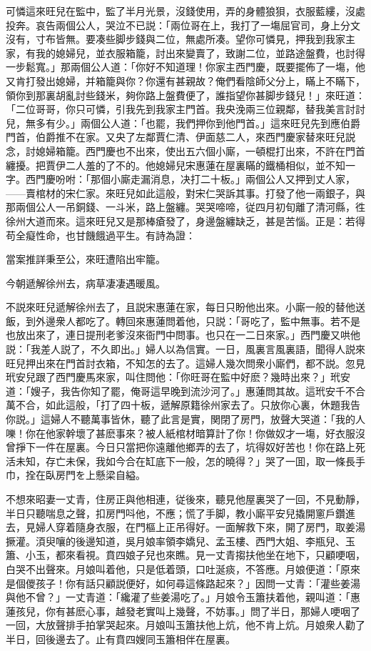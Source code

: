 可憐這來旺兒在監中，監了半月光景，沒錢使用，弄的身體狼狽，衣服藍縷，沒處投奔。哀告兩個公人，哭泣不已説：「兩位哥在上，我打了一塲屈官司，身上分文沒有，寸布皆無。要凑些脚步錢與二位，無處所凑。望你可憐見，押我到我家主家，有我的媳婦兒，並衣服箱籠，討出來變賣了，致謝二位，並路途盤費，也討得一步鬆寬。」那兩個公人道：「你好不知道理！你家主西門慶，既要擺佈了一塲，他又肯打發出媳婦，并箱籠與你？你還有甚親故？俺們看陰師父分上，瞞上不瞞下，領你到那裏胡亂討些錢米，夠你路上盤費便了，誰指望你甚脚步錢兒！」來旺道：「二位哥哥，你只可憐，引我先到我家主門首。我央浼兩三位親鄰，替我美言討討兒，無多有少。」兩個公人道：「也罷，我們押你到他門首。」這來旺兒先到應伯爵門首，伯爵推不在家。又央了左鄰賈仁清、伊面慈二人，來西門慶家替來旺兒説念，討媳婦箱籠。西門慶也不出來，使出五六個小廝，一頓棍打出來，不許在門首纏擾。把賈伊二人羞的了不的。他媳婦兒宋惠蓮在屋裏瞞的鐵桶相似，並不知一字。西門慶吩咐：「那個小廝走漏消息，决打二十板。」兩個公人又押到丈人家，——賣棺材的宋仁家。來旺兒如此這般，對宋仁哭訴其事。打發了他一兩銀子，與那兩個公人一吊銅錢、一斗米，路上盤纏。哭哭啼啼，従四月初旬離了清河縣，徃徐州大道而來。這來旺兒又是那棒瘡發了，身邊盤纏缺乏，甚是苦惱。正是：若得苟全癡性命，也甘饑餓過平生。有詩為證：

\begin{myquote}
當案推詳秉至公，來旺遭陷出牢籠。

今朝遞解徐州去，病草凄凄遇暖風。
\end{myquote}

不説來旺兒遞解徐州去了，且説宋惠蓮在家，每日只盼他出來。小廝一般的替他送飯，到外邊衆人都吃了。轉回來惠蓮問着他，只説：「哥吃了，監中無事。若不是也放出來了，連日提刑老爹沒來衙門中問事。也只在一二日來家。」西門慶又哄他説：「我差人説了，不久即出。」婦人以為信實。一日，風裏言風裏語，聞得人説來旺兒押出來在門首討衣箱，不知怎的去了。這婦人幾次問衆小廝們，都不説。忽見玳安兒跟了西門慶馬來家，叫住問他：「你旺哥在監中好麽？幾時出來？」玳安道：「嫂子，我告你知了罷，俺哥這早晚到流沙河了。」惠蓮問其故。這玳安千不合萬不合，如此這般，「打了四十板，遞解原籍徐州家去了。只放你心裏，休題我告你説。」這婦人不聽萬事皆休，聽了此言是實，関閉了房門，放聲大哭道：「我的人嚛！你在他家幹壞了甚麽事來？被人紙棺材暗算計了你！你做奴才一塲，好衣服沒曾掙下一件在屋裏。今日只當把你遠離他鄉弄的去了，坑得奴好苦也！你在路上死活未知，存亡未保，我如今合在缸底下一般，怎的曉得？」哭了一囬，取一條長手巾，拴在臥房門を上懸梁自縊。

不想來昭妻一丈青，住房正與他相連，従後來，聽見他屋裏哭了一回，不見動靜，半日只聽喘息之聲，扣房門呌他，不應；慌了手脚，教小廝平安兒撬開窻戶鑽進去，見婦人穿着隨身衣服，在門樞上正吊得好。一面解救下來，開了房門，取姜湯撅灌。湏臾嚷的後邊知道，吳月娘率領李嬌兒、孟玉樓、西門大姐、李瓶兒、玉簫、小玉，都來看視。賁四娘子兒也來瞧。見一丈青搊扶他坐在地下，只顧哽咽，白哭不出聲來。月娘叫着他，只是低着頭，口吐涎痰，不答應。月娘便道：「原來是個儍孩子！你有話只顧説便好，如何尋這條路起來？」因問一丈青：「灌些姜湯與他不曾？」一丈青道：「纔灌了些姜湯吃了。」月娘令玉簫扶着他，親叫道：「惠蓮孩兒，你有甚麽心事，越發老實叫上幾聲，不妨事。」問了半日，那婦人哽咽了一回，大放聲排手拍掌哭起來。月娘叫玉簫扶他上炕，他不肯上炕。月娘衆人勸了半日，回後邊去了。止有賁四嫂同玉簫相伴在屋裏。

